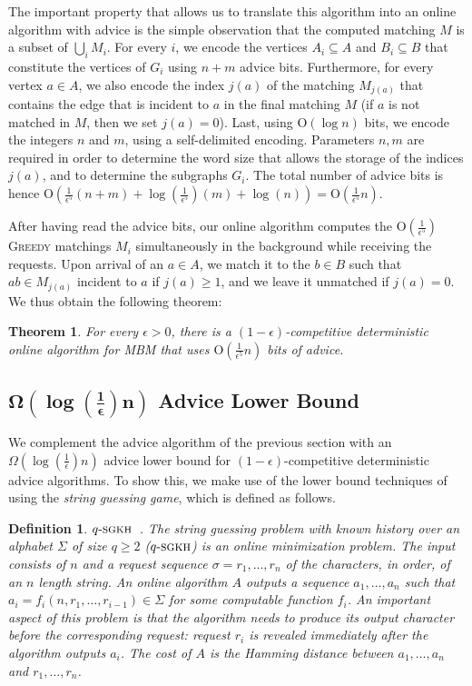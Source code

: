 \documentclass[a4paper]{article}
\newcommand{\Order}{\mathrm{O}}
\newcommand{\qStr}{{q\text{-}\textsc{sgkh}}}
\newtheorem{theorem}{Theorem}
\newtheorem{definition}{Definition}
\begin{document}
The important property that allows us to translate this algorithm into an online algorithm with advice
is the simple observation that the computed matching $M$ is a subset of $\bigcup_i M_i$. For every $i$,
we encode the vertices
$A_i \subseteq A$ and $B_i \subseteq B$ that constitute the vertices of $G_i$ using $n+m$ advice bits.
Furthermore, for every vertex $a \in A$, we also encode the index $j(a)$
of the matching $M_{j(a)}$ that contains the edge that is incident to $a$ in the final matching $M$
(if $a$ is not matched in $M$, then we set $j(a)=0$). Last, using $\Order(\log n)$ bits, we encode the integers
$n$ and $m$, using a self-delimited encoding. Parameters $n,m$ are required in order to determine the word size
that allows the storage of the indices $j(a)$, and to determine the subgraphs $G_i$. The total number of
advice bits is hence $\Order(\frac{1}{\epsilon^5} (n+m) + \log (\frac{1}{\epsilon^5}) (m) + \log(n)) = \Order(\frac{1}{\epsilon^5} n)$.

After having read the advice bits, our online algorithm computes the $\Order(\frac{1}{\epsilon^5})$ \textsc{Greedy}
matchings $M_i$ simultaneously in the background while receiving the requests. Upon arrival of an
$a \in A$, we match it to the $b \in B$ such that $ab \in M_{j(a)}$ incident to $a$ if $j(a) \ge 1$,
and we leave it unmatched if $j(a) = 0$. We thus obtain the following theorem:

\begin{theorem} \label{thm:ub-advice}
 For every $\epsilon > 0$, there is a $(1-\epsilon)$-competitive deterministic online algorithm for \textsc{MBM}
 that uses $\Order(\frac{1}{\epsilon^5} n)$ bits of advice.
\end{theorem}



\subsection{$\mathbf{\Omega(\log(\frac{1}{\epsilon})n)}$ Advice Lower Bound}
We complement the advice algorithm of the previous section with an $\Omega(\log (\frac{1}{\epsilon}) n)$
advice lower bound for $(1-\epsilon)$-competitive deterministic advice algorithms.
To show this, we make use of the lower bound techniques
of \cite{bhkkss14} using the {\em string guessing game}, which is defined as follows.

\begin{definition}{$\qStr$~\textup{\cite{bhkkss14}}.} The {\em string guessing problem with known history}
over an alphabet $\Sigma$ of size $q \ge 2$ ($\qStr$) is an online minimization problem. The input consists
of $n$ and a request sequence $\sigma = r_1,\ldots,r_n$ of the characters, in order, of an $n$ length string.
An online algorithm $A$ outputs a sequence $a_1,\ldots,a_n$ such that $a_i = f_i(n,r_1,\ldots,r_{i-1}) \in \Sigma$
for some computable function $f_i$.  An important aspect of this problem is that the algorithm needs to produce its output character \emph{before} the corresponding request: request $r_i$ is revealed immediately after the algorithm outputs $a_i$. The cost of $A$ is the Hamming distance between $a_1,\ldots,a_n$ and $r_1,\ldots,r_n$.
\end{definition}
\end{document}
